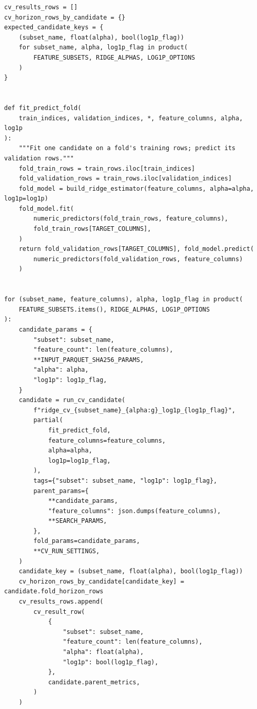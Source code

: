 \begin{verbatim}
cv_results_rows = []
cv_horizon_rows_by_candidate = {}
expected_candidate_keys = {
    (subset_name, float(alpha), bool(log1p_flag))
    for subset_name, alpha, log1p_flag in product(
        FEATURE_SUBSETS, RIDGE_ALPHAS, LOG1P_OPTIONS
    )
}


def fit_predict_fold(
    train_indices, validation_indices, *, feature_columns, alpha, log1p
):
    """Fit one candidate on a fold's training rows; predict its validation rows."""
    fold_train_rows = train_rows.iloc[train_indices]
    fold_validation_rows = train_rows.iloc[validation_indices]
    fold_model = build_ridge_estimator(feature_columns, alpha=alpha, log1p=log1p)
    fold_model.fit(
        numeric_predictors(fold_train_rows, feature_columns),
        fold_train_rows[TARGET_COLUMNS],
    )
    return fold_validation_rows[TARGET_COLUMNS], fold_model.predict(
        numeric_predictors(fold_validation_rows, feature_columns)
    )


for (subset_name, feature_columns), alpha, log1p_flag in product(
    FEATURE_SUBSETS.items(), RIDGE_ALPHAS, LOG1P_OPTIONS
):
    candidate_params = {
        "subset": subset_name,
        "feature_count": len(feature_columns),
        **INPUT_PARQUET_SHA256_PARAMS,
        "alpha": alpha,
        "log1p": log1p_flag,
    }
    candidate = run_cv_candidate(
        f"ridge_cv_{subset_name}_{alpha:g}_log1p_{log1p_flag}",
        partial(
            fit_predict_fold,
            feature_columns=feature_columns,
            alpha=alpha,
            log1p=log1p_flag,
        ),
        tags={"subset": subset_name, "log1p": log1p_flag},
        parent_params={
            **candidate_params,
            "feature_columns": json.dumps(feature_columns),
            **SEARCH_PARAMS,
        },
        fold_params=candidate_params,
        **CV_RUN_SETTINGS,
    )
    candidate_key = (subset_name, float(alpha), bool(log1p_flag))
    cv_horizon_rows_by_candidate[candidate_key] = candidate.fold_horizon_rows
    cv_results_rows.append(
        cv_result_row(
            {
                "subset": subset_name,
                "feature_count": len(feature_columns),
                "alpha": float(alpha),
                "log1p": bool(log1p_flag),
            },
            candidate.parent_metrics,
        )
    )


\end{verbatim}
